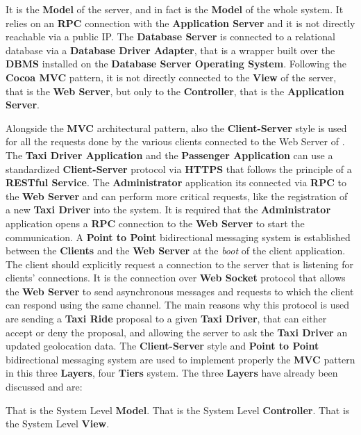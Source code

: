 \begin{itemize}
\begin{itemize}
		 It is the \textbf{Model} of the server, and in fact is the \textbf{Model} of the whole \myTaxiService{} system. It relies on an \textbf{RPC} connection with the \textbf{Application Server} and it is not directly reachable via a public IP. The \textbf{Database Server} is connected to a relational database via a \textbf{Database Driver Adapter}, that is a wrapper built over the \textbf{DBMS} installed on the \textbf{Database Server Operating System}. Following the \textbf{Cocoa MVC} pattern, it is not directly connected to the \textbf{View} of the server, that is the \textbf{Web Server}, but only to the \textbf{Controller}, that is the \textbf{Application Server}.
	\end{itemize}
\end{itemize}
Alongside the \textbf{MVC} architectural pattern, also the \textbf{Client-Server} style is used for all the requests done by the various clients connected to the Web Server of \myTaxiService{}. The \textbf{Taxi Driver Application} and the \textbf{Passenger Application} can use a standardized \textbf{Client-Server} protocol via \textbf{HTTPS} that follows the principle of a \textbf{RESTful Service}. The \textbf{Administrator} application its connected via \textbf{RPC} to the \textbf{Web Server} and can perform more critical requests, like the registration of a new \textbf{Taxi Driver} into the system. It is required that the \textbf{Administrator} application opens a \textbf{RPC} connection to the \textbf{Web Server} to start the communication.
A \textbf{Point to Point} bidirectional messaging system is established between the \textbf{Clients} and the \textbf{Web Server} at the \textit{boot} of the client application. The client should explicitly request a connection to the server that is listening for clients' connections. It is the connection over \textbf{Web Socket} protocol that allows the \textbf{Web Server} to send asynchronous messages and requests to which the client can respond using the same channel. The main reasons why this protocol is used are sending a \textbf{Taxi Ride} proposal to a given \textbf{Taxi Driver}, that can either accept or deny the proposal, and allowing the server to ask the \textbf{Taxi Driver} an updated geolocation data.
The \textbf{Client-Server} style and \textbf{Point to Point} bidirectional messaging system are used to implement properly the \textbf{MVC} pattern in this three \textbf{Layers}, four \textbf{Tiers} system.
The three \textbf{Layers} have already been discussed and are:
\begin{itemize}
	 That is the System Level \textbf{Model}.
	 That is the System Level \textbf{Controller}.
	 That is the System Level \textbf{View}.
\end{itemize}
